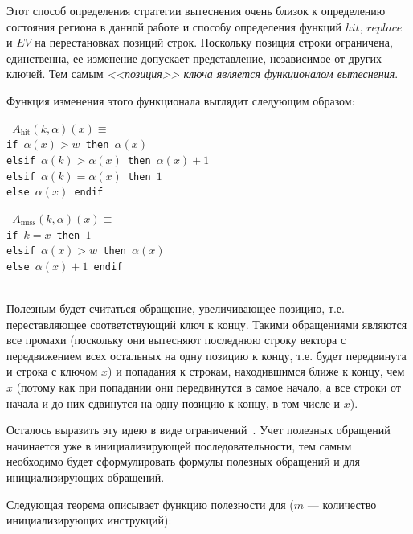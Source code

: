 Этот способ определения стратегии вытеснения \LRU очень близок к определению состояния региона в данной работе и способу определения функций $hit$, $replace$ и $EV$ на перестановках позиций строк. Поскольку позиция строки ограничена, единственна, ее изменение допускает представление, независимое от других ключей. Тем самым \emph{<<позиция>> ключа является функционалом вытеснения}.

Функция изменения этого функционала выглядит следующим образом:\\

\parbox{0.5\textwidth}{ \tt
$A_{\mbox{hit}}(k, \alpha)(x) \equiv$\\
if $\alpha(x) > w$ then $\alpha(x)$\\
elsif $\alpha(k) > \alpha(x)$ then $\alpha(x)+1$\\
elsif $\alpha(k) = \alpha(x)$ then $1$\\
else $\alpha(x)$ endif%
}\parbox{0.5\textwidth}{\tt
$A_{\mbox{miss}}(k, \alpha)(x) \equiv$\\
if $k = x$ then $1$\\
elsif $\alpha(x) > w$ then $\alpha(x)$\\
else $\alpha(x) + 1$ endif}\\

Полезным будет считаться обращение, увеличивающее позицию, т.е.
переставляющее соответствующий ключ к концу. Такими обращениями являются все
промахи (поскольку они вытесняют последнюю строку вектора с передвижением всех остальных на одну позицию к концу, т.е. будет передвинута и строка с ключом $x$) и
попадания к строкам, находившимся ближе к концу, чем $x$ (потому как при попадании они передвинутся в самое начало, а все строки от начала и до них сдвинутся на одну
позицию к концу, в том числе и $x$).

Осталось выразить эту идею в виде ограничений~\cite{my_ewdts_2009}.
Учет полезных обращений начинается уже в инициализирующей последовательности,
тем самым необходимо будет сформулировать формулы полезных обращений и для
инициализирующих обращений.

Следующая теорема описывает функцию полезности для \LRU ($m$ --- количество
инициализирующих инструкций):

\begin{theorem}\label{correct_mirror_LRU} \LRUusefuls
\end{theorem}

